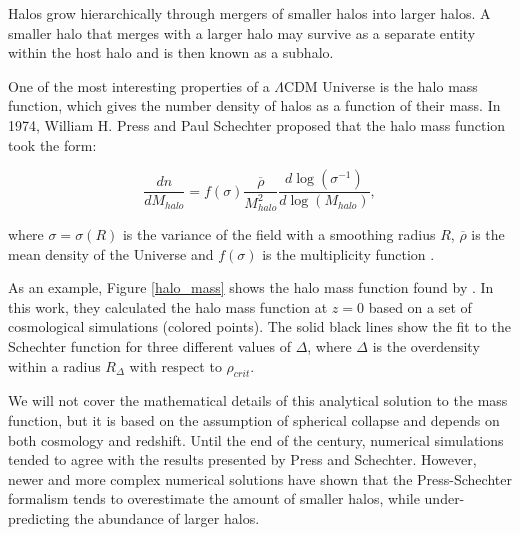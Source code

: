 Halos grow hierarchically through mergers of smaller halos into larger halos. A smaller halo that merges with a larger halo may survive as a separate entity within the host halo and is then known as a subhalo. 

One of the most interesting properties of a $\Lambda$CDM Universe is the halo mass function, which gives the number density of halos as a function of their mass. In 1974, William H. Press and Paul Schechter proposed that the halo mass function took the form:

\begin{equation}
    \frac{dn}{dM_{halo}} = f(\sigma)\frac{\overline{\rho}}{M_{halo}^2}\frac{d\log(\sigma^{-1})}{d\log(M_{halo})},
\end{equation}

where $\sigma = \sigma (R)$ is the variance of the field with a smoothing radius $R$, $\overline{\rho}$ is the mean density of the Universe and $f(\sigma)$ is the multiplicity function \parencite{Press1974}. 

As an example, Figure \ref{halo_mass} shows the halo mass function found by \textcite{Tinker2008}. In this work, they calculated the halo mass function at $z=0$ based on a set of cosmological simulations (colored points). The solid black lines show the fit to the Schechter function for three different values of $\Delta$, where $\Delta$ is the overdensity within a radius $R_{\Delta}$ with respect to $\rho_{crit}$.

We will not cover the mathematical details of this analytical solution to the mass function, but it is based on the assumption of spherical collapse and depends on both cosmology and redshift.
Until the end of the century, numerical simulations tended to agree with the results presented by Press and Schechter. However, newer and more complex numerical solutions have shown that the Press-Schechter formalism tends to overestimate the amount of smaller halos, while under-predicting the abundance of larger halos.


